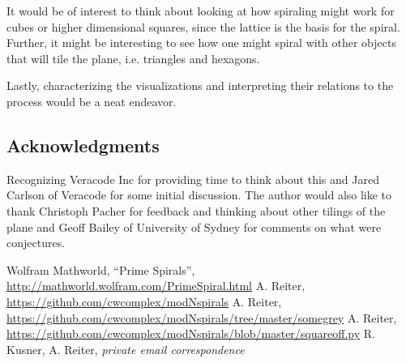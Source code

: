 \documentclass[11pt]{amsart}
\theoremstyle{mydef}
\begin{document}
It would be of interest to think about looking at how spiraling might work for cubes or higher dimensional squares, since the lattice is the basis for the spiral. Further, it might be interesting to see how one might spiral with other objects that will tile the plane, i.e. triangles and hexagons.

Lastly, characterizing the visualizations and interpreting their relations to the process would be a neat endeavor. 

\subsection{Acknowledgments}
Recognizing Veracode Inc for providing time to think about this and Jared Carlson of Veracode for some initial discussion. The author would also like to thank Christoph Pacher for feedback and thinking about other tilings of the plane and Geoff Bailey of University of Sydney for comments on what were conjectures.

\begin{thebibliography}{1}
 Wolfram Mathworld, ``Prime Spirals'', \url{http://mathworld.wolfram.com/PrimeSpiral.html}
 A. Reiter, \url{https://github.com/cwcomplex/modNspirals}
 A. Reiter, \url{https://github.com/cwcomplex/modNspirals/tree/master/somegrey}
 A. Reiter, \url{https://github.com/cwcomplex/modNspirals/blob/master/squareoff.py}
 R. Kusner, A. Reiter, \textit{private email correspondence}

\end{thebibliography}
\end{document}
